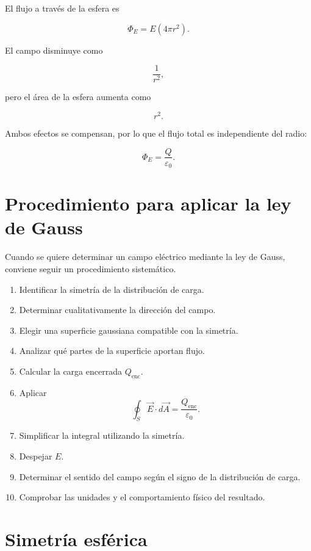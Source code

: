 \begin{interpretacion}

El flujo a través de la esfera es

\[
\Phi_E=E(4\pi r^2).
\]

El campo disminuye como

\[
\frac{1}{r^2},
\]

pero el área de la esfera aumenta como

\[
r^2.
\]

Ambos efectos se compensan, por lo que el flujo total es independiente del radio:

\[
\boxed{\Phi_E=\frac{Q}{\varepsilon_0}}.
\]

\end{interpretacion}


\section{Procedimiento para aplicar la ley de Gauss}

Cuando se quiere determinar un campo eléctrico mediante la ley de Gauss, conviene
seguir un procedimiento sistemático.

\begin{enumerate}
    \item Identificar la simetría de la distribución de carga.
    \item Determinar cualitativamente la dirección del campo.
    \item Elegir una superficie gaussiana compatible con la simetría.
    \item Analizar qué partes de la superficie aportan flujo.
    \item Calcular la carga encerrada \(Q_{\text{enc}}\).
    \item Aplicar
    \[
    \oint_S\vec E\cdot d\vec A
    =
    \frac{Q_{\text{enc}}}{\varepsilon_0}.
    \]
    \item Simplificar la integral utilizando la simetría.
    \item Despejar \(E\).
    \item Determinar el sentido del campo según el signo de la distribución de carga.
    \item Comprobar las unidades y el comportamiento físico del resultado.
\end{enumerate}


\section{Simetría esférica}

